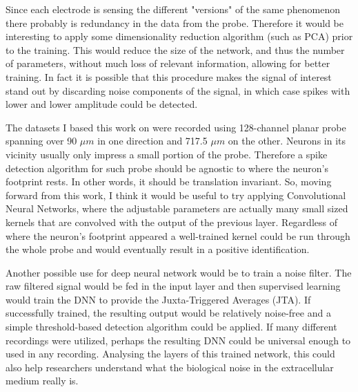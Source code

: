 Since each electrode is sensing the different "versions" of the same phenomenon there probably is redundancy in the data from the probe. Therefore it would be interesting to apply some dimensionality reduction algorithm (such as PCA) prior to the training. This would reduce the size of the network, and thus the number of parameters, without much loss of relevant information, allowing for better training. In fact it is possible that this procedure makes the signal of interest stand out by discarding noise components of the signal, in which case spikes with lower and lower amplitude could be detected.

The datasets I based this work on were recorded using 128-channel planar probe spanning over 90 $\mu m$ in one direction and 717.5 $\mu m$ on the other. Neurons in its vicinity usually only impress a small portion of the probe. Therefore a spike detection algorithm for such probe should be agnostic to where the neuron's footprint rests. In other words, it should be translation invariant. So, moving forward from this work, I think it would be useful to try applying Convolutional Neural Networks, where the adjustable parameters are actually many small sized kernels that are convolved with the output of the previous layer. Regardless of where the neuron's footprint appeared a well-trained kernel could be run through the whole probe and would eventually result in a positive identification.

Another possible use for deep neural network would be to train a noise filter. The raw filtered signal would be fed in the input layer and then supervised learning would train the DNN to provide the Juxta-Triggered Averages (JTA). If successfully trained, the resulting output would be relatively noise-free and a simple threshold-based detection algorithm could be applied. If many different recordings were utilized, perhaps the resulting DNN could be universal enough to used in any recording.
Analysing the layers of this trained network, this could also help researchers understand what the biological noise in the extracellular medium really is.

\cleardoublepage
